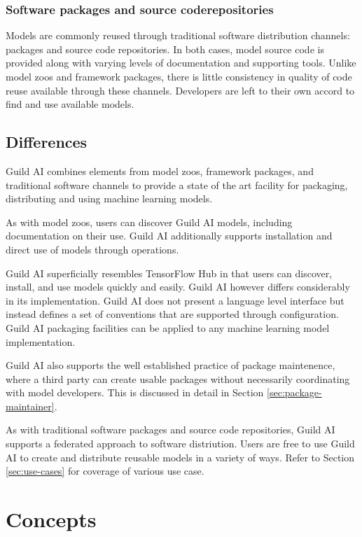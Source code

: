 \documentclass{article}
\begin{document}
\subsubsection{Software packages and source coderepositories}

Models are commonly reused through traditional software distribution
channels: packages and source code repositories. In both cases, model
source code is provided along with varying levels of documentation and
supporting tools. Unlike model zoos and framework packages, there is
little consistency in quality of code reuse available through these
channels. Developers are left to their own accord to find and use
available models.

\subsection{Differences}

Guild AI combines elements from model zoos, framework packages, and
traditional software channels to provide a state of the art facility
for packaging, distributing and using machine learning models.

As with model zoos, users can discover Guild AI models, including
documentation on their use. Guild AI additionally supports
installation and direct use of models through operations.

Guild AI superficially resembles TensorFlow Hub in that users can
discover, install, and use models quickly and easily. Guild AI however
differs considerably in its implementation. Guild AI does not present
a language level interface but instead defines a set of conventions
that are supported through configuration. Guild AI packaging
facilities can be applied to any machine learning model
implementation.

Guild AI also supports the well established practice of package
maintenence, where a third party can create usable packages without
necessarily coordinating with model developers. This is discussed in
detail in Section \ref{sec:package-maintainer}.

As with traditional software packages and source code repositories,
Guild AI supports a federated approach to software distriution. Users
are free to use Guild AI to create and distribute reusable models in a
variety of ways. Refer to Section \ref{sec:use-cases} for coverage of
various use case.

\section{Concepts}
\end{document}
